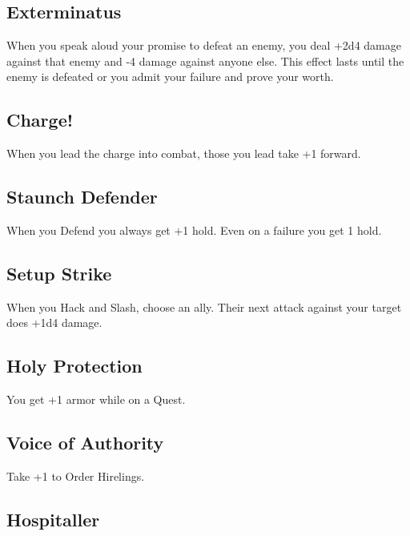 \subsection{Exterminatus}   
         

When you speak aloud your promise to defeat an enemy, you deal +2d4 damage against that enemy and -4 damage against anyone else. This effect lasts until the enemy is defeated or you admit your failure and prove your worth.

         
\subsection{Charge!}   
         

When you lead the charge into combat, those you lead take +1 forward.

         
\subsection{Staunch Defender}    
         

When you Defend you always get +1 hold. Even on a failure you get 1 hold.

         
\subsection{Setup Strike}    
         

When you Hack and Slash, choose an ally. Their next attack against your target does +1d4 damage.

         
\subsection{Holy Protection}    
         

You get +1 armor while on a Quest.

         
\subsection{Voice of Authority}    
         

Take +1 to Order Hirelings.

         
\subsection{Hospitaller}   
         

